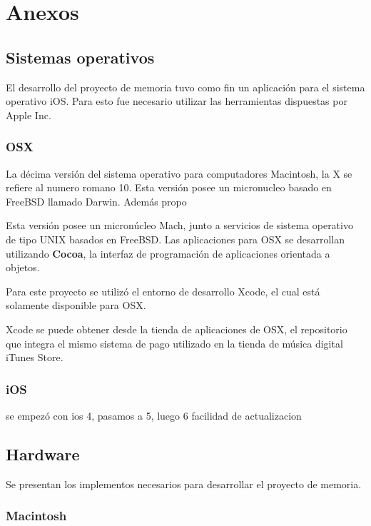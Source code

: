 \chapter{Anexos}
	\section{Sistemas operativos}
	El desarrollo del proyecto de memoria tuvo como fin un aplicación para el sistema operativo iOS. Para esto fue necesario utilizar las herramientas dispuestas por Apple Inc.
		\subsection{OSX}
La décima versión del sistema operativo para computadores Macintosh, la X se refiere al numero romano 10.
Esta versión posee un micronucleo basado en FreeBSD llamado Darwin. Además propo

Esta versión posee un micronúcleo Mach, junto a servicios de sistema operativo de tipo UNIX basados en FreeBSD.
Las aplicaciones para OSX se desarrollan utilizando \textbf{Cocoa}, la interfaz de programación de aplicaciones orientada a objetos.

Para este proyecto se utilizó el entorno de desarrollo Xcode, el cual está solamente disponible para OSX.

Xcode se puede obtener desde la tienda de aplicaciones de OSX, el repositorio que integra el mismo sistema de pago utilizado en la tienda de música digital iTunes Store.
		
		\subsection{iOS}
		

		se empezó con ios 4, pasamos a 5, luego 6		
		facilidad de actualizacion

	\section{Hardware}
		Se presentan los implementos necesarios para desarrollar el proyecto de memoria.
		\subsection{Macintosh}
	
